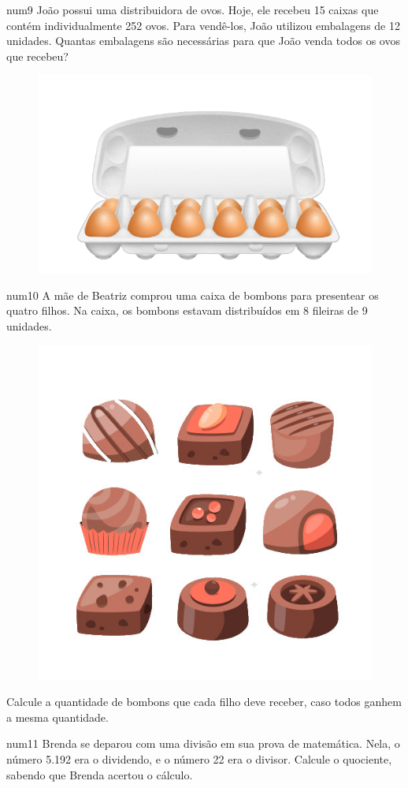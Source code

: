 \pagebreak
num{9} João possui uma distribuidora de ovos. Hoje, ele recebeu 15 caixas  
que contém individualmente 252 ovos. Para vendê-los, João utilizou embalagens de
12 unidades. Quantas embalagens são necessárias para que João venda 
todos os ovos que recebeu?

\begin{figure}[htpb!]
\centering
\includegraphics[width=.5\textwidth]{./media/image16a.png}
\end{figure}

num{10} A mãe de Beatriz comprou uma caixa de bombons para presentear os quatro filhos. 
Na caixa, os bombons estavam distribuídos em 8 fileiras de 9 unidades. 

\begin{figure}[htpb!]
\centering
\includegraphics[width=.4\textwidth]{./media/image16b.jpeg}
\end{figure}

Calcule a quantidade de bombons que cada filho deve receber, caso todos ganhem a mesma quantidade.


num{11} Brenda se deparou com uma divisão em sua prova de matemática. 
Nela, o número 5.192 era o dividendo, e o número 22 era o divisor. 
Calcule o quociente, sabendo que Brenda acertou o cálculo.

